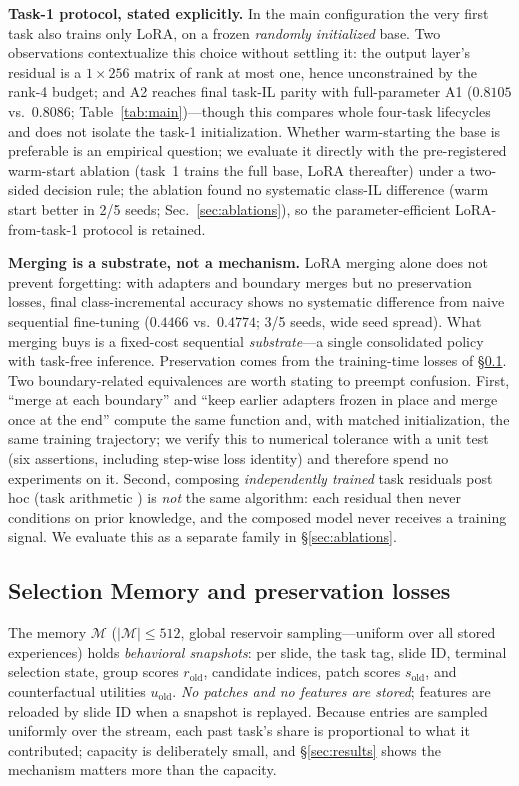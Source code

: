 \documentclass[11pt]{article}
\begin{document}
\textbf{Task-1 protocol, stated explicitly.} In the main configuration the very first task also trains only LoRA, on a frozen \emph{randomly initialized} base. Two observations contextualize this choice without settling it: the output layer's residual is a $1{\times}256$ matrix of rank at most one, hence unconstrained by the rank-4 budget; and A2 reaches final task-IL parity with full-parameter A1 ($0.8105$ vs.\ $0.8086$; Table~\ref{tab:main})---though this compares whole four-task lifecycles and does not isolate the task-1 initialization. Whether warm-starting the base is preferable is an empirical question; we evaluate it directly with the pre-registered warm-start ablation (task~1 trains the full base, LoRA thereafter) under a two-sided decision rule; the ablation found no systematic class-IL difference (warm start better in 2/5 seeds; Sec.~\ref{sec:ablations}), so the parameter-efficient LoRA-from-task-1 protocol is retained.

\textbf{Merging is a substrate, not a mechanism.} LoRA merging alone does not prevent forgetting: with adapters and boundary merges but no preservation losses, final class-incremental accuracy shows no systematic difference from naive sequential fine-tuning ($0.4466$ vs.\ $0.4774$; 3/5 seeds, wide seed spread). What merging buys is a fixed-cost sequential \emph{substrate}---a single consolidated policy with task-free inference. Preservation comes from the training-time losses of \S\ref{sec:memory}. Two boundary-related equivalences are worth stating to preempt confusion. First, ``merge at each boundary'' and ``keep earlier adapters frozen in place and merge once at the end'' compute the same function and, with matched initialization, the same training trajectory; we verify this to numerical tolerance with a unit test (six assertions, including step-wise loss identity) and therefore spend no experiments on it. Second, composing \emph{independently trained} task residuals post hoc (task arithmetic \citep{ilharco2023task}) is \emph{not} the same algorithm: each residual then never conditions on prior knowledge, and the composed model never receives a training signal. We evaluate this as a separate family in \S\ref{sec:ablations}.

\subsection{Selection Memory and preservation losses}\label{sec:memory}
The memory $\mathcal{M}$ ($|\mathcal{M}|\le 512$, global reservoir sampling---uniform over all stored experiences) holds \emph{behavioral snapshots}: per slide, the task tag, slide ID, terminal selection state, group scores $r_{\mathrm{old}}$, candidate indices, patch scores $s_{\mathrm{old}}$, and counterfactual utilities $u_{\mathrm{old}}$. \emph{No patches and no features are stored}; features are reloaded by slide ID when a snapshot is replayed. Because entries are sampled uniformly over the stream, each past task's share is proportional to what it contributed; capacity is deliberately small, and \S\ref{sec:results} shows the mechanism matters more than the capacity.
\end{document}
